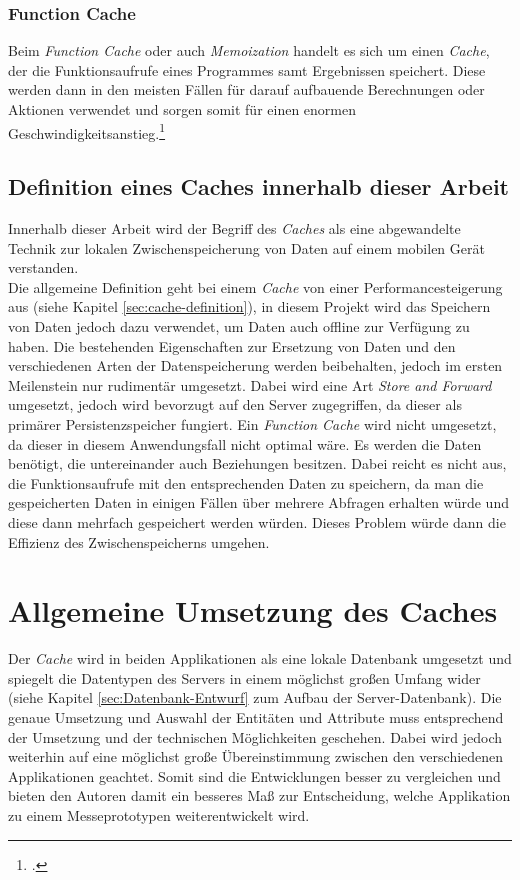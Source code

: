 \subsubsection*{Function Cache}
\label{sssec:cache-function-cache}
Beim \textit{Function Cache} oder auch \textit{Memoization} handelt es sich um einen \textit{Cache}, der die Funktionsaufrufe eines Programmes samt Ergebnissen speichert. Diese werden dann in den meisten Fällen für darauf aufbauende Berechnungen oder Aktionen verwendet und sorgen somit für einen enormen Geschwindigkeitsanstieg.\footcite{Cache-Memoization}
\subsection{Definition eines Caches innerhalb dieser Arbeit}
\label{ssec:cache-unsere-definition}
Innerhalb dieser Arbeit wird der Begriff des \textit{Caches} als eine abgewandelte Technik zur lokalen Zwischenspeicherung von Daten auf einem mobilen Gerät verstanden. \\Die allgemeine Definition geht bei einem \textit{Cache} von einer Performancesteigerung aus (siehe Kapitel \ref{sec:cache-definition}), in diesem Projekt wird das Speichern von Daten jedoch dazu verwendet, um Daten auch offline zur Verfügung zu haben. Die bestehenden Eigenschaften zur Ersetzung von Daten und den verschiedenen Arten der Datenspeicherung werden beibehalten, jedoch im ersten Meilenstein nur rudimentär umgesetzt. Dabei wird eine Art \textit{Store and Forward} umgesetzt, jedoch wird bevorzugt auf den Server zugegriffen, da dieser als primärer Persistenzspeicher fungiert. Ein \textit{Function Cache} wird nicht umgesetzt, da dieser in diesem Anwendungsfall nicht optimal wäre. Es werden die Daten benötigt, die untereinander auch Beziehungen besitzen. Dabei reicht es nicht aus, die Funktionsaufrufe mit den entsprechenden Daten zu speichern, da man die gespeicherten Daten in einigen Fällen über mehrere Abfragen erhalten würde und diese dann mehrfach gespeichert werden würden. Dieses Problem würde dann die Effizienz des Zwischenspeicherns umgehen.
\section{Allgemeine Umsetzung des Caches}
\label{sec:cache-umsetzung}
Der \textit{Cache} wird in beiden Applikationen als eine lokale Datenbank umgesetzt und spiegelt die Datentypen des Servers in einem möglichst großen Umfang wider (siehe Kapitel \ref{sec:Datenbank-Entwurf} zum Aufbau der Server-Datenbank). Die genaue Umsetzung und Auswahl der Entitäten und Attribute muss entsprechend der Umsetzung und der technischen Möglichkeiten geschehen. Dabei wird jedoch weiterhin auf eine möglichst große Übereinstimmung zwischen den verschiedenen Applikationen geachtet. Somit sind die Entwicklungen besser zu vergleichen und bieten den Autoren damit ein besseres Maß zur Entscheidung, welche Applikation zu einem Messeprototypen weiterentwickelt wird.
